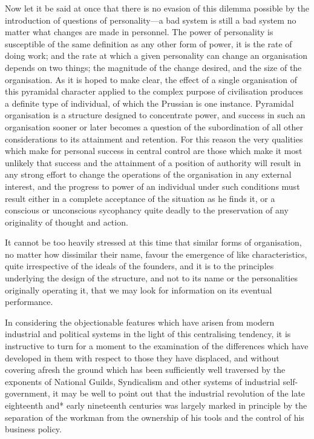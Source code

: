 \documentclass{book}
\begin{document}
Now let it be said at once that there is no evasion of this dilemma possible by the introduction of questions of personality—a bad system is still a bad system no matter what changes are made in personnel. The power of personality is susceptible of the same definition as any other form of power, it is the rate of doing work; and the rate at which a given personality can change an organisation depends on two things; the magnitude of the change desired, and the size of the organisation. As it is hoped to make clear, the effect of a single organisation of this pyramidal character applied to the complex purpose of civilisation produces a definite type of individual, of which the Prussian is one instance. Pyramidal organisation is a structure designed to concentrate power, and success in such an organisation sooner or later becomes a question of the subordination of all other considerations to its attainment and retention. For this reason the very qualities which make for personal success in central control are those which make it most unlikely that success and the attainment of a position of authority will result in any strong effort to change the operations of the organisation in any external interest, and the progress to power of an individual under such conditions must result either in a complete acceptance of the situation as he finds it, or a conscious or unconscious sycophancy quite deadly to the preservation of any originality of thought and action.

It cannot be too heavily stressed at this time that similar forms of organisation, no matter how dissimilar their name, favour the emergence of like characteristics, quite irrespective of the ideals of the founders, and it is to the principles underlying the design of the structure, and not to its name or the personalities originally operating it, that we may look for information on its eventual performance.

In considering the objectionable features which have arisen from modern industrial and political systems in the light of this centralising tendency, it is instructive to turn for a moment to the examination of the differences which have developed in them with respect to those they have displaced, and without covering afresh the ground which has been sufficiently well traversed by the exponents of National Guilds, Syndicalism and other systems of industrial self-government, it may be well to point out that the industrial revolution of the late eighteenth and* early nineteenth centuries was largely marked in principle by the separation of the workman from the ownership of his tools and the control of his business policy.
\end{document}
